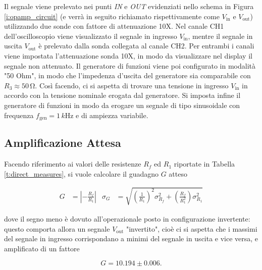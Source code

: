 \documentclass[a4paper,11pt]{article} %
\begin{document}
\noindent Il segnale viene prelevato nei punti \textit{IN} e \textit{OUT} evidenziati nello schema in Figura
\ref{i:opamp_circuit} (e verrà in seguito richiamato rispettivamente come $V_{\text{in}}$ e $V_{\text{out}}$)
utilizzando due sonde con fattore di attenuazione 10X. Nel canale CH1 dell'oscilloscopio viene visualizzato il segnale
in ingresso $V_{\text{in}}$, mentre il segnale in uscita $V_{\text{out}}$ è prelevato dalla sonda collegata al canale
CH2. Per entrambi i canali viene impostata l'attenuazione sonda 10X, in modo da visualizzare nel display il segnale non
attenuato. Il generatore di funzioni viene poi configurato in modalità "50 Ohm", in modo che l'impedenza d'uscita del
generatore sia comparabile con $R_3\approx 50\,\si{\ohm}$. Così facendo, ci si aspetta di trovare una tensione in ingresso
$V_{\text{in}}$ in accordo con la tensione nominale erogata dal generatore. Si imposta infine il generatore di funzioni
in modo da erogare un segnale di tipo sinusoidale con frequenza $f_{\text{gen}}=1\,\si{k\hertz}$ e di ampiezza
variabile.


\subsection{Amplificazione Attesa}\label{s:guadagno}
Facendo riferimento ai valori delle resistenze  $R_f$ ed $R_1$ riportate in Tabella \ref{t:direct_measures}, si vuole
calcolare il guadagno $G$ atteso

\begin{align}\label{e:guadagno}
	G&=\left|-\frac{R_{f}}{R_{1}}\right| 
	&
	\sigma_{G}&=\sqrt{	\left(	\frac{	1	}{	R_{1}	}	\right)^2	\sigma_{R_{f}}^2	
	+	\left(	\frac{	R_{f}	}{	R_{1}^2	}	\right)\sigma_{R_{1}}^2	}	
\end{align}

\noindent dove il segno meno è dovuto all'operazionale posto in configurazione invertente: questo comporta allora un
segnale  $V_{\text{out}}$ "invertito", cioè ci si aspetta che i massimi del segnale in ingresso corrispondano a minimi
del segnale in uscita e vice versa, e amplificato di un fattore 

\begin{equation}
	G = 10.194 \pm 0.006.
\end{equation}
\end{document}
